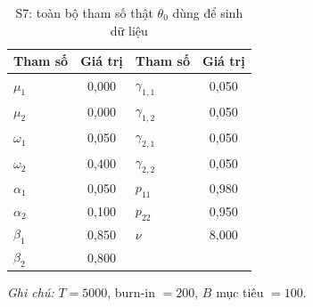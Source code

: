 \documentclass[11pt,a4paper]{article}
\begin{document}
\begin{table}[H]\centering\small
\caption{S7: toàn bộ tham số thật $\theta_0$ dùng để sinh dữ liệu}
\begin{tabularx}{\textwidth}{l C  l C}
\toprule
\textbf{Tham số} & \textbf{Giá trị} & \textbf{Tham số} & \textbf{Giá trị} \\
\midrule
$\mu_1$ & 0{,}000 & $\gamma_{1,1}$ & 0{,}050 \\
$\mu_2$ & 0{,}000 & $\gamma_{1,2}$ & 0{,}050 \\
$\omega_1$ & 0{,}050 & $\gamma_{2,1}$ & 0{,}050 \\
$\omega_2$ & 0{,}400 & $\gamma_{2,2}$ & 0{,}050 \\
$\alpha_1$ & 0{,}050 & $p_{11}$ & 0{,}980 \\
$\alpha_2$ & 0{,}100 & $p_{22}$ & 0{,}950 \\
$\beta_1$ & 0{,}850 & $\nu$ & 8{,}000 \\
$\beta_2$ & 0{,}800 & & \\
\bottomrule
\end{tabularx}
\vspace{0.2em}\raggedright\scriptsize \emph{Ghi chú:} $T=5000$, burn-in $=200$, $B$ mục tiêu $=100$.
\end{table}
\end{document}
